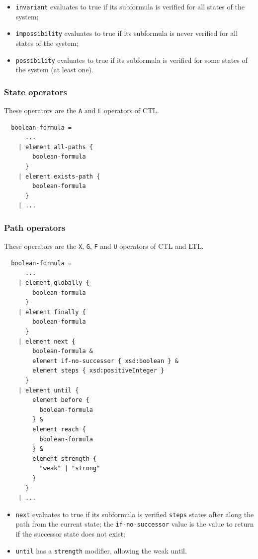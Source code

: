 \documentclass[10pt,english,a4paper]{article}
\begin{document}
\begin{itemize}
  \item \lstinline!invariant! evaluates to true if its subformula
    is verified for all states of the system;
  \item \lstinline!impossibility! evaluates to true if its subformula
    is never verified for all states of the system;
  \item \lstinline!possibility! evaluates to true if its subformula
    is verified for some states of the system (at least one).
\end{itemize}

\subsubsection{State operators}

These operators are the \lstinline!A! and \lstinline!E! operators of CTL.

\begin{lstlisting}
  boolean-formula =
      ...
    | element all-paths {
        boolean-formula
      }
    | element exists-path {
        boolean-formula
      }
    | ...
\end{lstlisting}

\subsubsection{Path operators}

These operators are the \lstinline!X!, \lstinline!G!, \lstinline!F! and \lstinline!U!
operators of CTL and LTL.

\begin{lstlisting}
  boolean-formula =
      ...
    | element globally {
        boolean-formula
      }
    | element finally {
        boolean-formula
      }
    | element next {
        boolean-formula &
        element if-no-successor { xsd:boolean } &
        element steps { xsd:positiveInteger }
      }
    | element until {
        element before {
          boolean-formula
        } &
        element reach {
          boolean-formula
        } &
        element strength {
          "weak" | "strong"
        }
      }
    | ...
\end{lstlisting}

\begin{itemize}
  \item \lstinline!next! evaluates to true if its subformula
    is verified \lstinline!steps! states after along the path from the current state;
    the \lstinline!if-no-successor! value is the value to return if the successor state does
    not exist;
  \item \lstinline!until! has a \lstinline!strength! modifier, allowing the weak until.
\end{itemize}
\end{document}
